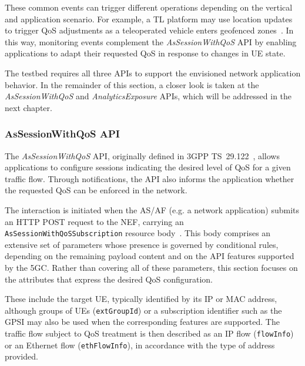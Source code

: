 These common events can trigger different operations depending on the vertical and application scenario. For example, a \acs{TL} platform may use location updates to trigger \acs{QoS} adjustments as a teleoperated vehicle enters geofenced zones~\cite{NextGenConnectivityDynamicQoS}. In this way, monitoring events complement the \textit{AsSessionWithQoS} \acs{API} by enabling applications to adapt their requested \acs{QoS} in response to changes in \acs{UE} state.

The testbed requires all three \acsp{API} to support the envisioned network application behavior. In the remainder of this section, a closer look is taken at the \textit{AsSessionWithQoS} and \textit{AnalyticsExposure} \acsp{API}, which will be addressed in the next chapter.

\subsubsection{AsSessionWithQoS \acs{API}}
\label{chap:proposal:exposure:nef:AsSessionWithQoS}

The \textit{AsSessionWithQoS} \acs{API}, originally defined in \acs{3GPP} TS~29.122~\cite{ETSI_TS_129_122_V18_8_0}, allows applications to configure sessions indicating the desired level of \acs{QoS} for a given traffic flow. Through notifications, the \acs{API} also informs the application whether the requested \acs{QoS} can be enforced in the network.

The interaction is initiated when the \acs{AS}/\acs{AF} (e.g. a network application) submits an \acs{HTTP} POST request to the \acs{NEF}, carrying an \texttt{AsSessionWithQoSSubscription} resource body~\cite{ETSI_TS_129_122_V18_8_0}. This body comprises an extensive set of parameters whose presence is governed by conditional rules, depending on the remaining payload content and on the \acs{API} features supported by the \acs{5GC}. Rather than covering all of these parameters, this section focuses on the attributes that express the desired \acs{QoS} configuration.

These include the target \acs{UE}, typically identified by its \acs{IP} or \acs{MAC} address, although groups of \acsp{UE} (\texttt{extGroupId}) or a subscription identifier such as the \ac{GPSI} may also be used when the corresponding features are supported. The traffic flow subject to \acs{QoS} treatment is then described as an \acs{IP} flow (\texttt{flowInfo}) or an Ethernet flow (\texttt{ethFlowInfo}), in accordance with the type of address provided.

